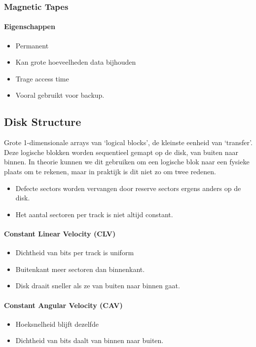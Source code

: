 \subsubsection{Magnetic Tapes}
\paragraph{Eigenschappen}
\begin{itemize}
	\item Permanent
	\item Kan grote hoeveelheden data bijhouden
	\item Trage access time
	\item Vooral gebruikt voor backup.
\end{itemize}
\subsection{Disk Structure}
Grote 1-dimensionale arrays van `logical blocks', de kleinste eenheid van `transfer'. Deze logische blokken worden sequentieel gemapt op de disk, van buiten naar binnen. In theorie kunnen we dit gebruiken om een logische blok naar een fysieke plaats om te rekenen, maar in praktijk is dit niet zo om twee redenen.
\begin{itemize}
	\item Defecte sectors worden vervangen door reserve sectors ergens anders op de disk.
	\item Het aantal sectoren per track is niet altijd constant.
\end{itemize}
\paragraph{Constant Linear Velocity (CLV)}
\begin{itemize}
	\item Dichtheid van bits per track is uniform
	\item Buitenkant meer sectoren dan binnenkant.
	\item Disk draait sneller als ze van buiten naar binnen gaat.
\end{itemize}
\paragraph{Constant Angular Velocity (CAV)}
\begin{itemize}
	\item Hoeksnelheid blijft dezelfde
	\item Dichtheid van bits daalt van binnen naar buiten.
\end{itemize}

